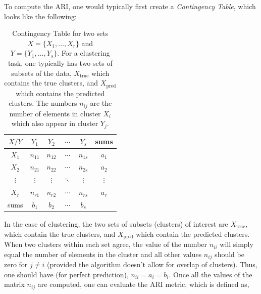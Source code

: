 \documentclass[8pt]{refart}
\begin{document}
To compute the ARI, one would typically first create a \textit{Contingency Table}, which looks like the following:
\begin{table}[H]
    \centering
    \begin{tabular}{c|c|c|c|c|c}
         $X/Y$ & $Y_1$ & $Y_2$ & $\cdots$ & $Y_s$ & sums\\
         \hline
         $X_1$ & $n_{11}$ & $n_{12}$ & $\cdots$ & $n_{1s}$ & $a_1$\\
         $X_2$ & $n_{21}$ & $n_{22}$ & $\cdots$ & $n_{2s}$ & $a_2$\\
         $\vdots$ & $\vdots$ & $\vdots$ & $\ddots$ & $\vdots$ & $\vdots$\\
         $X_r$ & $n_{r1}$ & $n_{r2}$ & $\cdots$ & $n_{rs}$ & $a_r$\\
         \hline
         sums & $b_1$ & $b_2$ & $\cdots$ & $b_s$ &\\
    \end{tabular}
    \caption{Contingency Table for two sets $X = \{X_1,\dots,X_r\}$ and $Y = \{Y_1,\dots,Y_s\}$.  For a clustering task, one typically has two sets of subsets of the data, $X_{\mathrm{true}}$ which contains the true clusters, and $X_{\mathrm{pred}}$ which contains the predicted clusters.  The numbers $n_{ij}$ are the number of elements in cluster $X_i$ which also appear in cluster $Y_j$.}
    \label{tab:my_label}
\end{table}
In the case of clustering, the two sets of subsets (clusters) of interest are $X_{\mathrm{true}}$, which contain the true clusters, and $X_{\mathrm{pred}}$ which contain the predicted clusters.  When two clusters within each set agree, the value of the number $n_{ii}$ will simply equal the number of elements in the cluster and all other values $n_{ij}$ should be zero for $j \neq i$ (provided the algorithm doesn't allow for overlap of clusters).  Thus, one should have (for perfect prediction), $n_{ii} = a_i = b_i$.  Once all the values of the matrix $n_{ij}$ are computed, one can evaluate the ARI metric, which is defined as,
\end{document}
